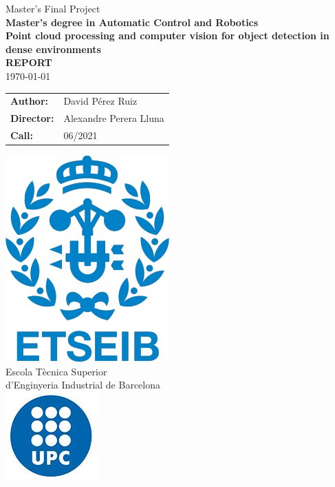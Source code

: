 \documentclass[../main.tex]{subfiles}
\begin{document}
\begin{titlepage}
    {\centering
    {\Huge Master's Final Project}\\
    \vspace{5mm}
    {\Large \textbf{Master's degree in Automatic Control and Robotics}}\\
    \vspace{20mm}
    \huge \textbf{Point cloud processing and computer vision for object detection in dense environments}\\
    \vspace{10mm}
    \Huge\textbf{REPORT}\\
    \vspace{3mm}
    \Large{\today}\\
    }
    \vspace{10mm}
    \hspace{2mm}
    \begin{tabular}{l@{ } l}
        \vspace{5mm}
        \Large \textbf{Author:} & \Large{David Pérez Ruiz} \\
        \vspace{5mm}
        \Large\textbf{Director:} & \Large{Alexandre Perera Lluna}\\
        
         \Large\textbf{Call: } & \Large{06/2021}\\
    \end{tabular}\par
    \vspace{10mm}
    {\centering
    \includegraphics[scale=0.3]{images/ETSEIB.png}\\
    {\Large Escola Tècnica Superior \\ d'Enginyeria Industrial de Barcelona}\\
    \vspace{3mm}
    \includegraphics[scale=0.4]{images/UPC.PNG}
    \par
    }
\end{titlepage}
\end{document}
